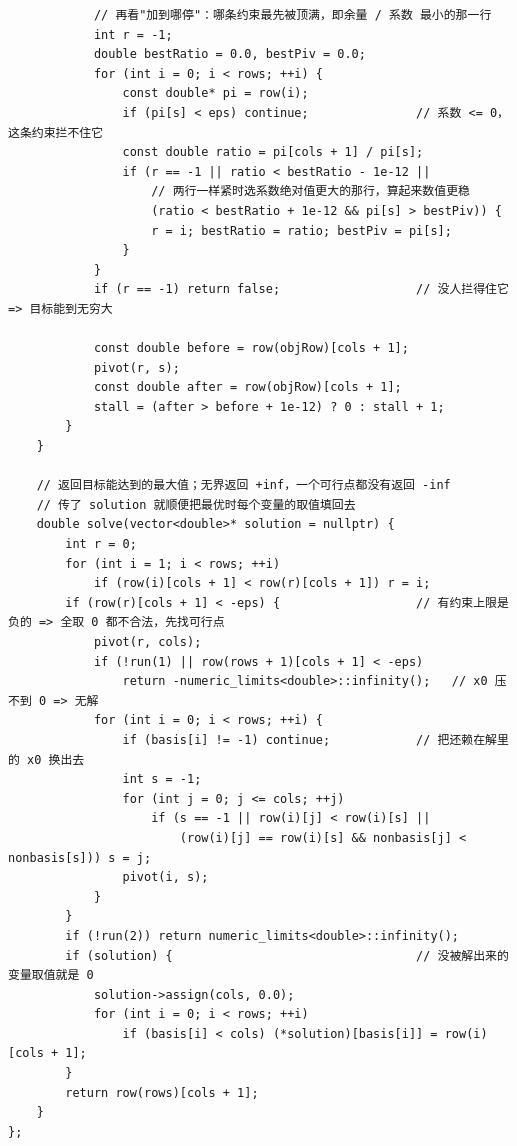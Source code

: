 \begin{verbatim}
            // 再看"加到哪停"：哪条约束最先被顶满，即余量 / 系数 最小的那一行
            int r = -1;
            double bestRatio = 0.0, bestPiv = 0.0;
            for (int i = 0; i < rows; ++i) {
                const double* pi = row(i);
                if (pi[s] < eps) continue;               // 系数 <= 0，这条约束拦不住它
                const double ratio = pi[cols + 1] / pi[s];
                if (r == -1 || ratio < bestRatio - 1e-12 ||
                    // 两行一样紧时选系数绝对值更大的那行，算起来数值更稳
                    (ratio < bestRatio + 1e-12 && pi[s] > bestPiv)) {
                    r = i; bestRatio = ratio; bestPiv = pi[s];
                }
            }
            if (r == -1) return false;                   // 没人拦得住它 => 目标能到无穷大

            const double before = row(objRow)[cols + 1];
            pivot(r, s);
            const double after = row(objRow)[cols + 1];
            stall = (after > before + 1e-12) ? 0 : stall + 1;
        }
    }

    // 返回目标能达到的最大值；无界返回 +inf，一个可行点都没有返回 -inf
    // 传了 solution 就顺便把最优时每个变量的取值填回去
    double solve(vector<double>* solution = nullptr) {
        int r = 0;
        for (int i = 1; i < rows; ++i)
            if (row(i)[cols + 1] < row(r)[cols + 1]) r = i;
        if (row(r)[cols + 1] < -eps) {                   // 有约束上限是负的 => 全取 0 都不合法，先找可行点
            pivot(r, cols);
            if (!run(1) || row(rows + 1)[cols + 1] < -eps)
                return -numeric_limits<double>::infinity();   // x0 压不到 0 => 无解
            for (int i = 0; i < rows; ++i) {
                if (basis[i] != -1) continue;            // 把还赖在解里的 x0 换出去
                int s = -1;
                for (int j = 0; j <= cols; ++j)
                    if (s == -1 || row(i)[j] < row(i)[s] ||
                        (row(i)[j] == row(i)[s] && nonbasis[j] < nonbasis[s])) s = j;
                pivot(i, s);
            }
        }
        if (!run(2)) return numeric_limits<double>::infinity();
        if (solution) {                                  // 没被解出来的变量取值就是 0
            solution->assign(cols, 0.0);
            for (int i = 0; i < rows; ++i)
                if (basis[i] < cols) (*solution)[basis[i]] = row(i)[cols + 1];
        }
        return row(rows)[cols + 1];
    }
};
		\end{verbatim}


